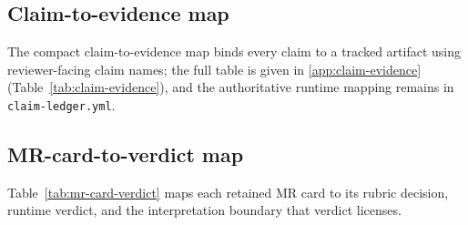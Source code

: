 \documentclass[preprint,12pt]{elsarticle}
\begin{document}
\subsection{Claim-to-evidence map}
\label{subsec:claim-evidence-map}

The compact claim-to-evidence map binds every claim to a tracked artifact using reviewer-facing claim names; the full table is given in \ref{app:claim-evidence} (Table~\ref{tab:claim-evidence}), and the authoritative runtime mapping remains in \texttt{claim-ledger.yml}.

\subsection{MR-card-to-verdict map}
\label{subsec:mr-card-verdict-map}

Table~\ref{tab:mr-card-verdict} maps each retained MR card to its rubric decision, runtime verdict, and the interpretation boundary that verdict licenses.
\end{document}
